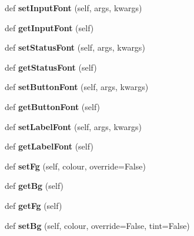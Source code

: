 \begin{DoxyCompactItemize}
def {\bfseries set\+Input\+Font} (self, args, kwargs)
\item 
\mbox{\label{classappjar_1_1gui_aef32abc7af7e8dc5e4f45d6c263a513c}} 
def {\bfseries get\+Input\+Font} (self)
\item 
\mbox{\label{classappjar_1_1gui_a32ae2efa6fd2be06474f12b40de46011}} 
def {\bfseries set\+Status\+Font} (self, args, kwargs)
\item 
\mbox{\label{classappjar_1_1gui_a78c18870e0bd5dc19df91747bd33b526}} 
def {\bfseries get\+Status\+Font} (self)
\item 
\mbox{\label{classappjar_1_1gui_ab5b7b796253832b3257a7ffc1e073907}} 
def {\bfseries set\+Button\+Font} (self, args, kwargs)
\item 
\mbox{\label{classappjar_1_1gui_a5855c66cdff383d72c9194395e9e3692}} 
def {\bfseries get\+Button\+Font} (self)
\item 
\mbox{\label{classappjar_1_1gui_a1a7dd97fbfc7b2326947e1305f583d38}} 
def {\bfseries set\+Label\+Font} (self, args, kwargs)
\item 
\mbox{\label{classappjar_1_1gui_a1f92233ed92cc73abd832896dfd4f791}} 
def {\bfseries get\+Label\+Font} (self)
\item 
\mbox{\label{classappjar_1_1gui_a7e0ac105e8c55c598a9c2ab95c763a7a}} 
def {\bfseries set\+Fg} (self, colour, override=False)
\item 
\mbox{\label{classappjar_1_1gui_a0a585fc3f912c22f97ee027e5181f789}} 
def {\bfseries get\+Bg} (self)
\item 
\mbox{\label{classappjar_1_1gui_aafce63ec058710558736faa30dd6c3a8}} 
def {\bfseries get\+Fg} (self)
\item 
\mbox{\label{classappjar_1_1gui_a7e52c6812cf6026f89b7cefde61189c9}} 
def {\bfseries set\+Bg} (self, colour, override=False, tint=False)
\item 

\end{DoxyCompactItemize}
